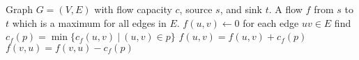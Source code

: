 
\begin{algorithmic}[1]
\Require Graph $G=(V,E)$ with flow capacity $c$, source $s$, and sink $t$.
\Ensure A flow $f$ from $s$ to $t$ which is a maximum for all edges in $E$.
\State $f(u,v) \gets 0$ for each edge $uv \in E$
  \State find $c_f(p) = \min\{ c_f(u,v)\ |\ (u,v) \in p\}$
     \State $f(u,v) = f(u,v) + c_f(p)$
     \State $f(v,u) = f(v,u) - c_f(p)$
  \EndFor
\EndWhile
\end{algorithmic}
